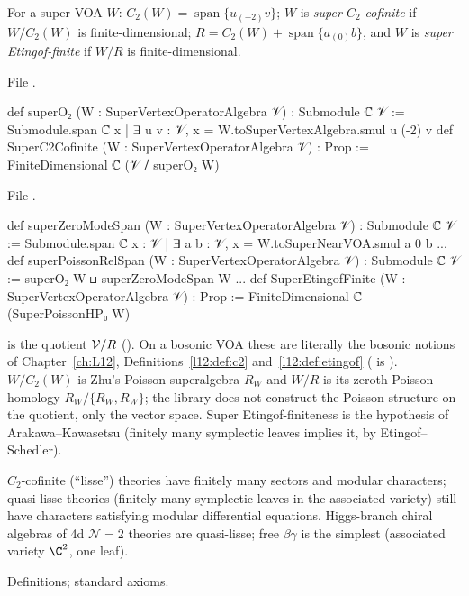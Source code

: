 \begin{definition}\label{l17:def:c2}
For a super VOA $W$: $C_2(W)=\operatorname{span}\{u_{(-2)}v\}$; $W$ is \emph{super $C_2$-cofinite}
if $W/C_2(W)$ is finite-dimensional; $R=C_2(W)+\operatorname{span}\{a_{(0)}b\}$, and $W$ is
\emph{super Etingof-finite} if $W/R$ is finite-dimensional.
\end{definition}
\noindent File .
\begin{leancode}
def superO₂ (W : SuperVertexOperatorAlgebra 𝒱) : Submodule ℂ 𝒱 :=
  Submodule.span ℂ {x | ∃ u v : 𝒱, x = W.toSuperVertexAlgebra.smul u (-2) v}
def SuperC2Cofinite (W : SuperVertexOperatorAlgebra 𝒱) : Prop :=
  FiniteDimensional ℂ (𝒱 ⧸ superO₂ W)
\end{leancode}
\noindent File .
\begin{leancode}
def superZeroModeSpan (W : SuperVertexOperatorAlgebra 𝒱) : Submodule ℂ 𝒱 :=
  Submodule.span ℂ {x : 𝒱 | ∃ a b : 𝒱, x = W.toSuperNearVOA.smul a 0 b}
...
def superPoissonRelSpan (W : SuperVertexOperatorAlgebra 𝒱) : Submodule ℂ 𝒱 :=
  superO₂ W ⊔ superZeroModeSpan W
...
def SuperEtingofFinite (W : SuperVertexOperatorAlgebra 𝒱) : Prop :=
  FiniteDimensional ℂ (SuperPoissonHP₀ W)
\end{leancode}
\begin{dictionary}
 is the quotient $\mathcal{V}/R$ (). On a bosonic
VOA these are literally the bosonic notions of Chapter~\ref{ch:L12}, Definitions~\ref{l12:def:c2}
and~\ref{l12:def:etingof} ( is ). $W/C_2(W)$ is
Zhu's Poisson superalgebra $R_W$ and $W/R$ is its zeroth Poisson homology $R_W/\{R_W,R_W\}$; the
library does not construct the Poisson structure on the quotient, only the vector space. Super
Etingof-finiteness is the hypothesis of Arakawa--Kawasetsu (finitely many symplectic leaves implies it,
by Etingof--Schedler).
\end{dictionary}
\begin{physics}
$C_2$-cofinite (``lisse'') theories have finitely many sectors and modular characters; quasi-lisse
theories (finitely many symplectic leaves in the associated variety) still have characters satisfying
modular differential equations. Higgs-branch chiral algebras of 4d $\mathcal N=2$ theories are
quasi-lisse; free $\beta\gamma$ is the simplest (associated variety $\C^2$, one leaf).
\end{physics}
\begin{status}
Definitions; standard axioms.
\end{status}

